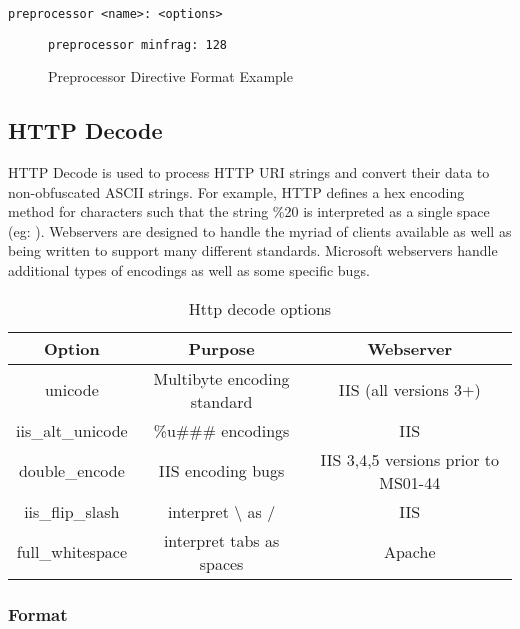 \documentclass[english]{report}
\begin{document}
\begin{verbatim}
preprocessor <name>: <options>
\end{verbatim}
%
\begin{figure}[!hbpt]
\begin{verbatim}
preprocessor minfrag: 128
\end{verbatim}

\caption{\label{preprocessor example}Preprocessor Directive Format Example}
\end{figure}

\subsection{HTTP Decode \label{sub:HTTP-Decode}}

HTTP Decode is used to process HTTP URI strings and convert their
data to non-obfuscated ASCII strings. For example, HTTP defines a
hex encoding method for characters such that the string \%20
is interpreted as a single space (eg:  ). Webservers
are designed to handle the myriad of clients available as well as
being written to support many different standards. Microsoft webservers
handle additional types of encodings as well as some specific bugs.

%
\begin{table}[!hbpt]

\caption{Http decode options}

\begin{center}\begin{tabular}{|c|c|c|}
\hline 
Option&
Purpose&
Webserver\\
\hline
\hline 
unicode&
Multibyte encoding standard&
IIS (all versions 3+)\\
\hline 
iis\_alt\_unicode&
\%u\#\#\# encodings&
IIS\\
\hline 
double\_encode&
IIS encoding bugs&
IIS 3,4,5 versions prior to MS01-44\\
\hline 
iis\_flip\_slash&
interpret \textbackslash{} as /&
IIS\\
\hline 
full\_whitespace&
interpret tabs as spaces&
Apache\\
\hline
\end{tabular}\end{center}
\end{table}



\subsubsection{Format}
\end{document}
